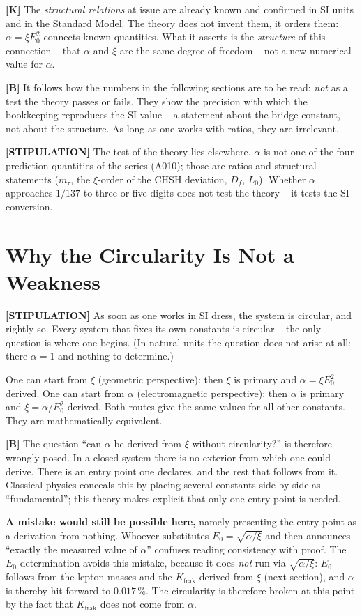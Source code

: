 \textbf{[K]} The \emph{structural relations} at issue are already known and
confirmed in SI units and in the Standard Model. The theory does not invent them,
it orders them: $\alpha = \xi E_0^2$ connects known quantities. What it asserts
is the \emph{structure} of this connection -- that $\alpha$ and $\xi$ are the same
degree of freedom -- not a new numerical value for $\alpha$.

\textbf{[B]} It follows how the numbers in the following sections are to be read:
\emph{not} as a test the theory passes or fails. They show the precision with
which the bookkeeping reproduces the SI value -- a statement about the bridge
constant, not about the structure. As long as one works with ratios, they are
irrelevant.

\textbf{[STIPULATION]} The test of the theory lies elsewhere. $\alpha$ is not one
of the four prediction quantities of the series (A010); those are ratios and
structural statements ($m_\tau$, the $\xi$-order of the CHSH deviation, $D_f$,
$L_0$). Whether $\alpha$ approaches $1/137$ to three or five digits does not test
the theory -- it tests the SI conversion.

\section{Why the Circularity Is Not a Weakness}

\textbf{[STIPULATION]} As soon as one works in SI dress, the system is circular,
and rightly so. Every system that fixes its own constants is circular -- the only
question is where one begins. (In natural units the question does not arise at all:
there $\alpha = 1$ and nothing to determine.)

One can start from $\xi$ (geometric perspective): then $\xi$ is primary and
$\alpha = \xi E_0^2$ derived. One can start from $\alpha$ (electromagnetic
perspective): then $\alpha$ is primary and $\xi = \alpha/E_0^2$ derived. Both
routes give the same values for all other constants. They are mathematically
equivalent.

\textbf{[B]} The question ``can $\alpha$ be derived from $\xi$ without circularity?''
is therefore wrongly posed. In a closed system there is no exterior from which
one could derive. There is an entry point one declares, and the rest that follows
from it. Classical physics conceals this by placing several constants side by side
as ``fundamental''; this theory makes explicit that only one entry point is needed.

\textbf{A mistake would still be possible here,} namely presenting the entry point
as a derivation from nothing. Whoever substitutes $E_0 = \sqrt{\alpha/\xi}$ and
then announces ``exactly the measured value of $\alpha$'' confuses reading consistency
with proof. The $E_0$ determination avoids this mistake, because it does
\emph{not} run via $\sqrt{\alpha/\xi}$: $E_0$ follows from the lepton masses and
the $K_\text{frak}$ derived from $\xi$ (next section), and $\alpha$ is thereby hit
forward to $0{.}017\,\%$. The circularity is therefore broken at this point by the
fact that $K_\text{frak}$ does not come from $\alpha$.

